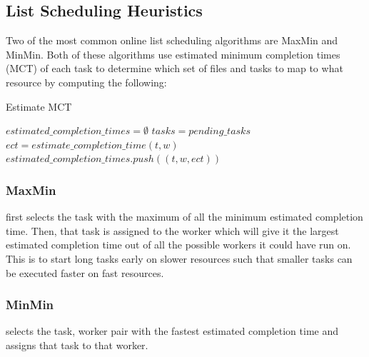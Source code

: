 \subsection*{List Scheduling Heuristics}

Two of the most common online list scheduling algorithms are MaxMin and MinMin.
Both of these algorithms use estimated minimum completion times (MCT) of each
task to determine which set of files and tasks to map to what resource by
computing the following:

\begin{algorithm}[H]
  \caption{Estimate MCT}
  \begin{algorithmic}
    \STATE $estimated\_completion\_times = \emptyset$
    \STATE $tasks = pending\_tasks$
        \STATE $ect = estimate\_completion\_time(t, w)$
        \STATE $estimated\_completion\_times.push((t, w, ect))$
      \ENDFOR
    \ENDFOR
  \end{algorithmic}
\end{algorithm}

\subsubsection*{MaxMin}
first selects the task with the maximum of all the minimum estimated completion time.
Then, that task is assigned to the worker which will give it the largest estimated
completion
time out of all the possible workers it could have run on. This is to start long
tasks early on slower resources such that smaller tasks can be executed faster
on fast resources.

\subsubsection*{MinMin}
selects the task, worker pair with the fastest estimated completion time and
assigns that task to that worker.
